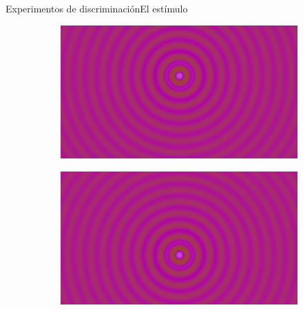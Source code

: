 \documentclass[
    11pt, %
    aspectratio=169, %
]{beamer}
\begin{document}
\begin{frame}{Experimentos de discriminación}{El estímulo}
\begin{center}
\begin{figure}[h]
\begin{subfigure}[b]{0.24\textwidth}
         \label{fig:three sin x}
     \end{subfigure}
     \hfill
     \begin{subfigure}[b]{0.24\textwidth}
         \centering
         \includegraphics[width=\textwidth]{Images/experimental/arriba_charla.png}
         \label{fig:five ovr x}
     \end{subfigure}
     \hfill  
     \begin{subfigure}[b]{0.24\textwidth}
         \centering
         \includegraphics[width=\textwidth]{Images/experimental/abajo_charla.png}
         \label{fig:fve over x}
     \end{subfigure}
     \label{fig:cap2_estimulo}
\end{figure} 
\end{center}
\end{frame}
\end{document}
